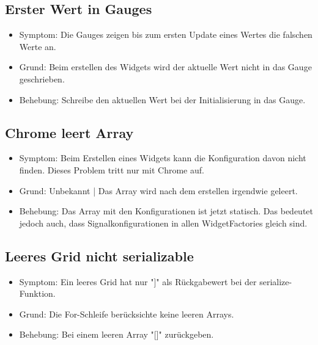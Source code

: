 \documentclass[qualitaetssicherung.tex]{subfiles}
\begin{document}
	\subsection{Erster Wert in Gauges}
	\begin{itemize}
		\item
		Symptom: Die Gauges zeigen bis zum ersten Update eines Wertes die falschen Werte an.
		\item
		Grund: Beim erstellen des Widgets wird der aktuelle Wert nicht in das Gauge geschrieben.
		\item
		Behebung: Schreibe den aktuellen Wert bei der Initialisierung in das Gauge.
	\end{itemize}	
	
	\subsection{Chrome leert Array}
	\begin{itemize}
		\item
		Symptom: Beim Erstellen eines Widgets kann die Konfiguration davon nicht finden. Dieses Problem tritt nur mit Chrome auf.
		\item
		Grund: Unbekannt | Das Array wird nach dem erstellen irgendwie geleert.
		\item
		Behebung: Das Array mit den Konfigurationen ist jetzt statisch. Das bedeutet jedoch auch, dass Signalkonfigurationen in allen WidgetFactories gleich sind. 
	\end{itemize}	
	
	\subsection{Leeres Grid nicht serializable}
	\begin{itemize}
		\item
		Symptom: Ein leeres Grid hat nur "]" als Rückgabewert bei der serialize-Funktion.
		\item
		Grund: Die For-Schleife berücksichte keine leeren Arrays.
		\item
		Behebung: Bei einem leeren Array "[]" zurückgeben. 
	\end{itemize}	
\end{document}
